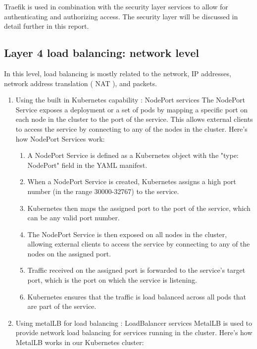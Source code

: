 Traefik is used in combination with the security layer services to allow for authenticating and authorizing access. The security layer will be discussed in detail further in this report. 

\subsection{Layer 4 load balancing: network level }

In this level, load balancing is mostly related to the network, IP addresses, network address translation ( NAT ), and packets. 
\begin{enumerate}[label = (\alph*)]

\item Using the built in Kubernetes capability : NodePort services 
The NodePort Service exposes a deployment or a set of pods by mapping a specific port on each node in the cluster to the port of the service. 
This allows external clients to access the service by connecting to any of the nodes in the cluster. 
Here's how NodePort Services work: 
    \begin{enumerate}[label = (\arabic*)]
    \item A NodePort Service is defined as a Kubernetes object with the           "type: NodePort" field in the YAML manifest. 
    \item When a NodePort Service is created, Kubernetes assigns a high port number (in the range 30000-32767) to the service. 
    \item Kubernetes then maps the assigned port to the port of the service, which can be any valid port number. 
    \item The NodePort Service is then exposed on all nodes in the cluster, allowing external clients to access the service by connecting to any of the nodes on the assigned port. 
    \item Traffic received on the assigned port is forwarded to the service's target port, which is the port on which the service is listening. 
    \item Kubernetes ensures that the traffic is load balanced across all pods that are part of the service. 
    \end{enumerate}

\item Using metalLB for load balancing : LoadBalancer services 
MetalLB is used to provide network load balancing for services running in the cluster. Here's how MetalLB works in our Kubernetes cluster: 


\end{enumerate}
